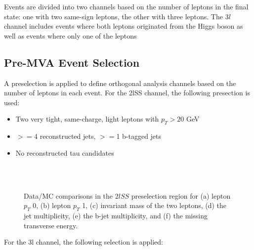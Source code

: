 Events are divided into two channels based on the number of leptons in the final state: one with two same-sign leptons, the other with three leptons. The $3l$ channel includes events where both leptons originated from the Higgs boson as well as events where only one of the leptons 


\subsection{Pre-MVA Event Selection}
\label{subsec:preMVA}

A preselection is applied to define orthogonal analysis channels based on the number of leptons in each event. For the 2lSS channel, the following presection is used:

\begin{itemize}
  \item Two very tight, same-charge, light leptons with $p_T > 20$ GeV
  \item $>=$4 reconstructed jets, $>=$1 b-tagged jets
  \item No reconstructed tau candidates
\end{itemize}

\begin{figure}[H]
    \\
    \\
    \caption{Data/MC comparisons in the $2lSS$ preselection region for (a) lepton $p_T$ 0, (b) lepton $p_T$ 1, (c) invariant mass of the two leptons, (d) the jet multiplicity, (e) the b-jet multiplicity, and (f) the missing transverse energy.}                           
    \label{fig:presel2lSS}
\end{figure}

For the 3l channel, the following selection is applied:

